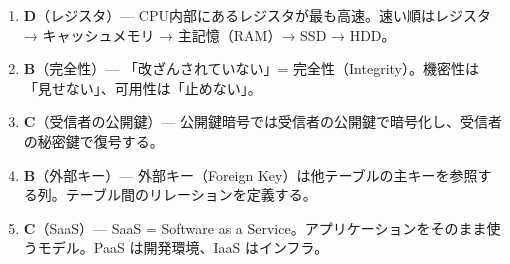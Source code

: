 \begin{enumerate}
  \item \textbf{D}（レジスタ）— CPU内部にあるレジスタが最も高速。速い順はレジスタ → キャッシュメモリ → 主記憶（RAM）→ SSD → HDD。
  \item \textbf{B}（完全性）— 「改ざんされていない」= 完全性（Integrity）。機密性は「見せない」、可用性は「止めない」。
  \item \textbf{C}（受信者の公開鍵）— 公開鍵暗号では受信者の公開鍵で暗号化し、受信者の秘密鍵で復号する。
  \item \textbf{B}（外部キー）— 外部キー（Foreign Key）は他テーブルの主キーを参照する列。テーブル間のリレーションを定義する。
  \item \textbf{C}（SaaS）— SaaS = Software as a Service。アプリケーションをそのまま使うモデル。PaaS は開発環境、IaaS はインフラ。
\end{enumerate}

